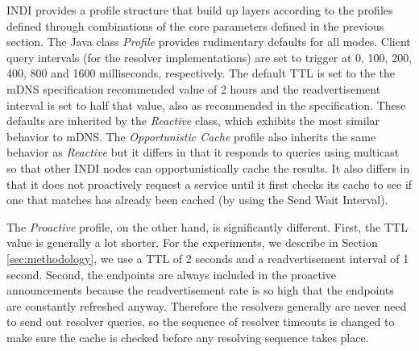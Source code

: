 INDI provides a profile structure that build up layers according to the profiles defined through combinations of the core parameters defined in the previous section.  The Java class \emph{Profile} provides rudimentary defaults for all modes.   Client query intervals (for the resolver implementations) are set to trigger at 0, 100, 200, 400, 800 and 1600 milliseconds, respectively. The default TTL is set to the the mDNS specification recommended value of 2 hours and the readvertisement interval is set to half that value, also as recommended in the specification.  These defaults are inherited  by the \emph{Reactive} class, which exhibits the most similar behavior to mDNS.   The \emph{Opportunistic Cache}  profile also inherits the same behavior as \emph{Reactive} but it differs in that it responds to queries using multicast so that other INDI nodes can opportunistically cache the results. It also differs in that it does not proactively request a service until it first checks its cache to see if one that matches has already been cached (by using the Send Wait Interval).

The \emph{Proactive} profile, on the other hand, is significantly different.  First, the TTL value is generally a lot shorter.   For the experiments, we describe in Section \ref{sec:methodology}, we use a TTL of 2 seconds and a readvertisement interval of 1 second.   Second, the endpoints are always included in the proactive announcements because the readvertisement rate is so high that the endpoints are constantly refreshed anyway. Therefore the resolvers generally are never need to send out resolver queries, so the sequence of resolver timeouts is changed to make sure the cache is checked before any resolving sequence takes place.  
  
